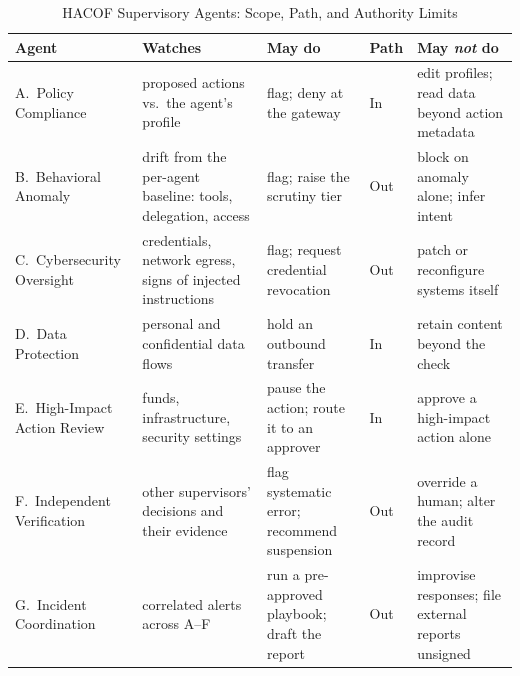 \documentclass{ieeeaccess}
\newcommand{\hacof}{HACOF}
\begin{document}
\begin{table}[!t]
\caption{\hacof{} Supervisory Agents: Scope, Path, and Authority Limits}
\label{tab:supervisors}
\centering
\footnotesize
\setlength{\tabcolsep}{4pt}
\begin{tabular}{>{\raggedright\arraybackslash}p{2.9cm}>{\raggedright\arraybackslash}p{3.6cm}>{\raggedright\arraybackslash}p{3.6cm}>{\raggedright\arraybackslash}p{1.0cm}>{\raggedright\arraybackslash}p{4.4cm}}
\toprule
\rowcolor{darkblue!15}
\textbf{Agent} & \textbf{Watches} & \textbf{May do} & \textbf{Path} & \textbf{May \emph{not} do} \\
\midrule
A.\ Policy Compliance & proposed actions vs.\ the agent's profile & flag; deny at the gateway & In & edit profiles; read data beyond action metadata \\
\rowcolor{darkblue!5}
B.\ Behavioral Anomaly & drift from the per-agent baseline: tools, delegation, access & flag; raise the scrutiny tier & Out & block on anomaly alone; infer intent \\
C.\ Cybersecurity Oversight & credentials, network egress, signs of injected instructions & flag; request credential revocation & Out & patch or reconfigure systems itself \\
\rowcolor{darkblue!5}
D.\ Data Protection & personal and confidential data flows & hold an outbound transfer & In & retain content beyond the check \\
E.\ High-Impact Action Review & funds, infrastructure, security settings & pause the action; route it to an approver & In & approve a high-impact action alone \\
\rowcolor{darkblue!5}
F.\ Independent Verification & other supervisors' decisions and their evidence & flag systematic error; recommend suspension & Out & override a human; alter the audit record \\
G.\ Incident Coordination & correlated alerts across A--F & run a pre-approved playbook; draft the report & Out & improvise responses; file external reports unsigned \\
\bottomrule
\end{tabular}
\end{table}
\end{document}

